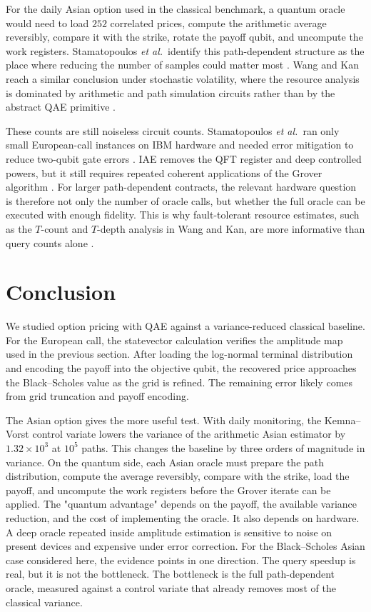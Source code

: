 \documentclass[12pt]{article}
\begin{document}
For the daily Asian option used in the classical benchmark, a quantum oracle would need to load $252$ correlated prices, compute the arithmetic average reversibly, compare it with the strike, rotate the payoff qubit, and uncompute the work registers.  Stamatopoulos \textit{et al.}\ identify this path-dependent structure as the place where reducing the number of samples could matter most \cite{stamatopoulosOptionPricingUsing2020}.  Wang and Kan reach a similar conclusion under stochastic volatility, where the resource analysis is dominated by arithmetic and path simulation circuits rather than by the abstract QAE primitive \cite{wangOptionPricingStochastic2024}.

These counts are still noiseless circuit counts.  Stamatopoulos \textit{et al.}\ ran only small European-call instances on IBM hardware and needed error mitigation to reduce two-qubit gate errors \cite{stamatopoulosOptionPricingUsing2020}.  IAE removes the QFT register and deep controlled powers, but it still requires repeated coherent applications of the Grover algorithm \cite{grinkoIterativeQuantumAmplitude2021}.  For larger path-dependent contracts, the relevant hardware question is therefore not only the number of oracle calls, but whether the full oracle can be executed with enough fidelity.  This is why fault-tolerant resource estimates, such as the $T$-count and $T$-depth analysis in Wang and Kan, are more informative than query counts alone \cite{wangOptionPricingStochastic2024}.

\section{Conclusion}

We studied option pricing with QAE against a variance-reduced classical baseline.  For the European call, the statevector calculation verifies the amplitude map used in the previous section.  After loading the log-normal terminal distribution and encoding the payoff into the objective qubit, the recovered price approaches the Black--Scholes value as the grid is refined.  The remaining error likely comes from grid truncation and payoff encoding.

The Asian option gives the more useful test.  With daily monitoring, the Kemna--Vorst control variate lowers the variance of the arithmetic Asian estimator by $1.32\times10^3$ at $10^5$ paths.  This changes the baseline by three orders of magnitude in variance.  On the quantum side, each Asian oracle must prepare the path distribution, compute the average reversibly, compare with the strike, load the payoff, and uncompute the work registers before the Grover iterate can be applied.
  The "quantum advantage" depends on the payoff, the available variance reduction, and the cost of implementing the oracle.  It also depends on hardware.  A deep oracle repeated inside amplitude estimation is sensitive to noise on present devices and expensive under error correction.  For the Black--Scholes Asian case considered here, the evidence points in one direction.  The query speedup is real, but it is not the bottleneck.  The bottleneck is the full path-dependent oracle, measured against a control variate that already removes most of the classical variance.

\printbibliography
\end{document}
